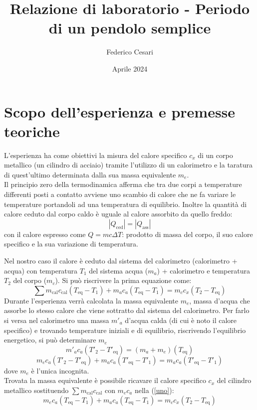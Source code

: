 \documentclass{article}
\title{Relazione di laboratorio - Periodo di un pendolo semplice}
\author{Federico Cesari}
\date{Aprile 2024}
\begin{document}
	
	\tableofcontents
	
	\newpage
	\section*{Scopo dell’esperienza e premesse teoriche}
	L'esperienza ha come obiettivi la misura del calore specifico \(c_{x}\) di un corpo metallico (un cilindro di acciaio) tramite l'utilizzo di un calorimetro e la taratura di quest'ultimo determinata dalla sua massa equivalente \(m_{e}\). \\
	
	\noindent
	Il principio zero della termodinamica afferma che tra due corpi a temperature differenti posti a contatto avviene uno scambio di calore che ne fa variare le temperature portandoli ad una temperatura di equilibrio. Inoltre la quantità di calore ceduto dal corpo caldo è uguale al calore assorbito da quello freddo:
	\[ 
	|Q_{\text{ced}}| = |Q_{\text{ass}}|
	\]
	con il calore espresso come \(Q = mc\Delta T\): prodotto di massa del corpo, il suo calore specifico e la sua variazione di temperatura. 
	
	Nel nostro caso il calore è ceduto dal sistema del calorimetro (calorimetro + acqua) con temperatura \(T_{1}\) del sistema acqua (\(m_{a}\)) + calorimetro  e temperatura \(T_{2}\) del corpo (\(m_{c}\)).  Si può riscrivere la prima equazione come:
	\begin{equation}\label{uno}
		\sum m_{\text{cal}}c_{\text{cal}}(T_{\text{eq}} - T_{1}) +  m_{a}c_{a}(T_{\text{eq}} - T_{1}) = m_{c}c_{x}(T_{2} - T_{\text{eq}})
	\end{equation}
	Durante l'esperienza verrà calcolata la massa equivalente \(m_{e}\), massa d'acqua che assorbe lo stesso calore che viene sottratto dal sistema del calorimetro. Per farlo si versa nel calorimetro una massa \(m'_{a}\) d'acqua calda (di cui è noto il calore specifico) e trovando temperature iniziali e di equilibrio, riscrivendo l'equilibrio energetico, si può determinare \(m_{e}\)
	\[ 
	m'_{a}c_{a}(T'_{2} - T'_{\text{eq}}) = (m_{a} + m_{e})(T_{\text{eq}})
	\]
	\[ 
	m_{e}c_{a}(T'_{2} - T'_{\text{eq}}) +  m_{a}c_{a}(T'_{\text{eq}} - T'_{1}) = m_{a}c_{a}(T'_{\text{eq}} - T'_{1})
	\]
	dove \(m_{e}\) è l'unica incognita. \\
	
	
	\noindent
	Trovata la massa equivalente è possibile ricavare il calore specifico \(c_{x}\) del cilindro metallico sostituendo \(\sum m_{\text{cal}}c_{\text{cal}}\) con \(m_{e}c_{a}\) nella (\ref{uno}):
	\[ 
	m_{e}c_{a}(T_{\text{eq}} - T_{1}) +  m_{a}c_{a}(T_{\text{eq}} - T_{1}) = m_{c}c_{x}(T_{2} - T_{\text{eq}})
	\]
	
\end{document}

